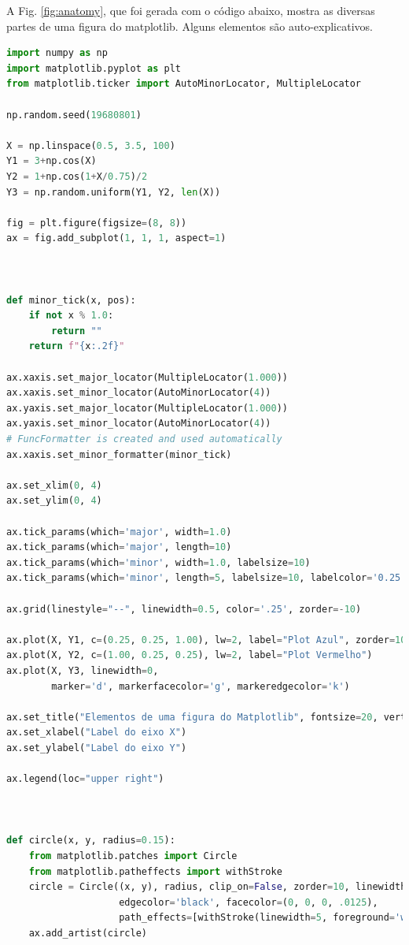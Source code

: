 A Fig. \ref{fig:anatomy}, que foi gerada com o código abaixo, mostra as diversas partes de uma figura do matplotlib. Alguns elementos são auto-explicativos.

\begin{lstlisting}[language=Python, frame=lines,basicstyle=\footnotesize, caption={Código com os elementos de uma figura do matplotlib}, label={lst:fig-anatomy}]
import numpy as np
import matplotlib.pyplot as plt
from matplotlib.ticker import AutoMinorLocator, MultipleLocator

np.random.seed(19680801)

X = np.linspace(0.5, 3.5, 100)
Y1 = 3+np.cos(X)
Y2 = 1+np.cos(1+X/0.75)/2
Y3 = np.random.uniform(Y1, Y2, len(X))

fig = plt.figure(figsize=(8, 8))
ax = fig.add_subplot(1, 1, 1, aspect=1)



def minor_tick(x, pos):
    if not x % 1.0:
        return ""
    return f"{x:.2f}"

ax.xaxis.set_major_locator(MultipleLocator(1.000))
ax.xaxis.set_minor_locator(AutoMinorLocator(4))
ax.yaxis.set_major_locator(MultipleLocator(1.000))
ax.yaxis.set_minor_locator(AutoMinorLocator(4))
# FuncFormatter is created and used automatically
ax.xaxis.set_minor_formatter(minor_tick)

ax.set_xlim(0, 4)
ax.set_ylim(0, 4)

ax.tick_params(which='major', width=1.0)
ax.tick_params(which='major', length=10)
ax.tick_params(which='minor', width=1.0, labelsize=10)
ax.tick_params(which='minor', length=5, labelsize=10, labelcolor='0.25')

ax.grid(linestyle="--", linewidth=0.5, color='.25', zorder=-10)

ax.plot(X, Y1, c=(0.25, 0.25, 1.00), lw=2, label="Plot Azul", zorder=10)
ax.plot(X, Y2, c=(1.00, 0.25, 0.25), lw=2, label="Plot Vermelho")
ax.plot(X, Y3, linewidth=0,
        marker='d', markerfacecolor='g', markeredgecolor='k')

ax.set_title("Elementos de uma figura do Matplotlib", fontsize=20, verticalalignment='bottom')
ax.set_xlabel("Label do eixo X")
ax.set_ylabel("Label do eixo Y")

ax.legend(loc="upper right")



def circle(x, y, radius=0.15):
    from matplotlib.patches import Circle
    from matplotlib.patheffects import withStroke
    circle = Circle((x, y), radius, clip_on=False, zorder=10, linewidth=1,
                    edgecolor='black', facecolor=(0, 0, 0, .0125),
                    path_effects=[withStroke(linewidth=5, foreground='w')])
    ax.add_artist(circle)



\end{lstlisting}
